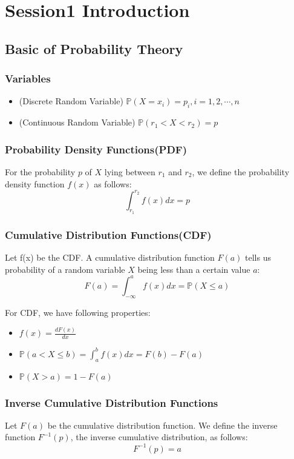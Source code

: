 \section{Session1 Introduction}
\subsection{Basic of Probability Theory}
\subsubsection{Variables}

\begin{itemize}
    \item (Discrete Random Variable)
    $\mathbb{P}(X = x_i) = p_i, i = 1,2,\cdots,n$
    \item (Continuous Random Variable)
    $\mathbb{P}(r_1<X<r_2) = p$
\end{itemize}

\subsubsection{Probability Density Functions(PDF)}
For the probability $p$ of $X$ lying between $r_1$ and $r_2$, we define the probability density function $f(x)$ as follows:
\[
    \int_{r_1}^{r_2}f(x)dx = p    
\]
\subsubsection{Cumulative Distribution Functions(CDF)}
Let f(x) be the CDF. A cumulative distribution function $F(a)$ tells us probability of a random variable $X$ being less than a certain value $a$:
\[
F(a) = \int_{-\infty}^a f(x)dx = \mathbb{P}(X\leq a)
\]

For CDF, we have following properties:
\begin{itemize}
    \item $f(x)=\frac{dF(x)}{dx}$
    \item $\mathbb{P}(a<X\leq b) = \int_a^bf(x)dx = F(b)-F(a)$
    \item $\mathbb{P}(X>a)=1-F(a)$
\end{itemize}

\subsubsection{Inverse Cumulative Distribution Functions}
Let $F(a)$ be the cumulative distribution function. We define the inverse function $F^{-1}(p)$, the inverse cumulative distribution, as follows:
\[
    F^{-1}(p) = a
\]

